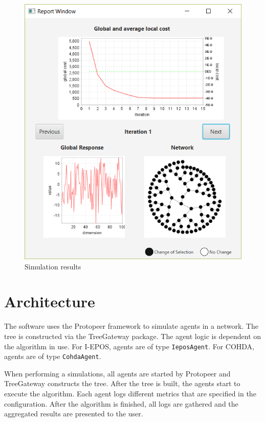 \documentclass[11pt]{article} %
\newcommand{\code}{\texttt}
\begin{document}
\begin{itemize}
\begin{figure}[h]
\centering
\includegraphics[scale=0.6]{img/results.png}
\caption{Simulation results}
\label{fig:result}
\end{figure}
\end{itemize}

\newpage
\section{Architecture}
The software uses the Protopeer framework to simulate agents in a network. The tree is constructed via the TreeGateway package. The agent logic is dependent on the algorithm in use. For I-EPOS, agents are of type \code{IeposAgent}. For COHDA, agents are of type \code{CohdaAgent}.

When performing a simulations, all agents are started by Protopeer and TreeGateway constructs the tree. After the tree is built, the agents start to execute the algorithm. Each agent logs different metrics that are specified in the configuration. After the algorithm is finished, all logs are gathered and the aggregated results are presented to the user.
\end{document}
